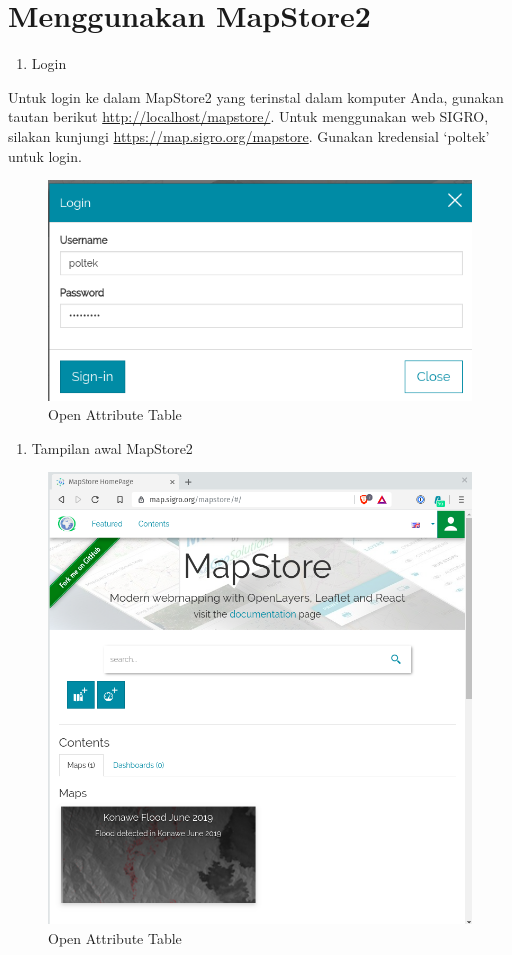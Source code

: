 \documentclass[]{book}
\providecommand{\tightlist}{%
  \setlength{\itemsep}{0pt}\setlength{\parskip}{0pt}}
\begin{document}
\hypertarget{menggunakan-mapstore2}{%
\section{Menggunakan MapStore2}\label{menggunakan-mapstore2}}

\begin{enumerate}
\def\labelenumi{\arabic{enumi}.}
\tightlist
\item
  Login
\end{enumerate}

Untuk login ke dalam MapStore2 yang terinstal dalam komputer Anda, gunakan tautan berikut \url{http://localhost/mapstore/}. Untuk menggunakan web SIGRO, silakan kunjungi \url{https://map.sigro.org/mapstore}. Gunakan kredensial `poltek' untuk login.

\begin{figure}

{\centering \includegraphics[width=0.5\linewidth]{images/08/ms1} 

}

\caption{Open Attribute Table}\label{fig:fig181}
\end{figure}

\begin{enumerate}
\def\labelenumi{\arabic{enumi}.}
\setcounter{enumi}{1}
\tightlist
\item
  Tampilan awal MapStore2
\end{enumerate}

\begin{figure}

{\centering \includegraphics[width=0.5\linewidth]{images/08/ms2} 

}

\caption{Open Attribute Table}\label{fig:fig182}
\end{figure}
\end{document}
